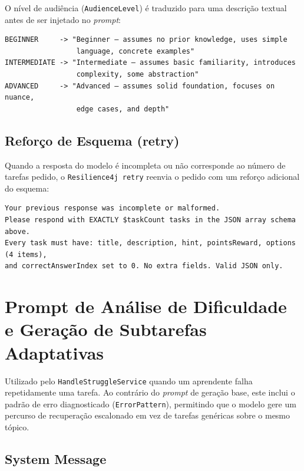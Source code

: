 O nível de audiência (\texttt{AudienceLevel}) é traduzido para uma descrição textual antes de ser injetado no \textit{prompt}:

\begin{verbatim}
BEGINNER     -> "Beginner — assumes no prior knowledge, uses simple
                 language, concrete examples"
INTERMEDIATE -> "Intermediate — assumes basic familiarity, introduces
                 complexity, some abstraction"
ADVANCED     -> "Advanced — assumes solid foundation, focuses on nuance,
                 edge cases, and depth"
\end{verbatim}

\subsection*{Reforço de Esquema (retry)}

Quando a resposta do modelo é incompleta ou não corresponde ao número de tarefas pedido, o \texttt{Resilience4j retry} reenvia o pedido com um reforço adicional do esquema:

\begin{verbatim}
Your previous response was incomplete or malformed.
Please respond with EXACTLY $taskCount tasks in the JSON array schema above.
Every task must have: title, description, hint, pointsReward, options (4 items),
and correctAnswerIndex set to 0. No extra fields. Valid JSON only.
\end{verbatim}

\section{Prompt de Análise de Dificuldade e Geração de Subtarefas Adaptativas} \label{ap:prompt-struggle}

Utilizado pelo \texttt{HandleStruggleService} quando um aprendente falha repetidamente uma tarefa. Ao contrário do \textit{prompt} de geração base, este inclui o padrão de erro diagnosticado (\texttt{ErrorPattern}), permitindo que o modelo gere um percurso de recuperação escalonado em vez de tarefas genéricas sobre o mesmo tópico.

\subsection*{System Message}

